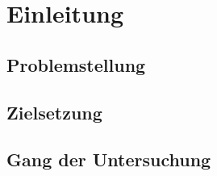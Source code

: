\newpage
\section{Einleitung}

\subsection{Problemstellung}

\subsection{Zielsetzung}

\subsection{Gang der Untersuchung}